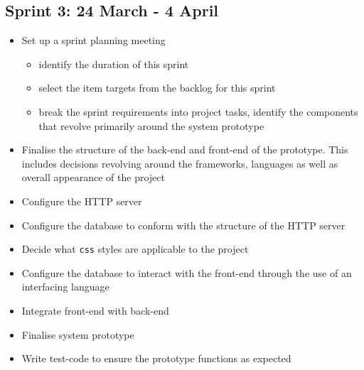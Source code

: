 \documentclass[10pt,twocolumn]{witseiepaper}
\begin{document}
	\subsection{Sprint 3: 24 March - 4 April}
	
	\begin{itemize}
		\item Set up a sprint planning meeting
		\begin{itemize}
			\item identify the duration of this sprint
			\item select the item targets from the backlog for this sprint
			\item break the sprint requirements into project tasks, identify the components that revolve primarily around the system prototype
		\end{itemize}
		\item Finalise the structure of the back-end and front-end of the prototype. This includes decisions revolving around the frameworks, languages as well as overall appearance of the project
		\item Configure the HTTP server
		\item Configure the database to conform with the structure of the HTTP server
		\item Decide what \texttt{css} styles are applicable to the project
		\item Configure the database to interact with the front-end through the use of an interfacing language
		\item Integrate front-end with back-end
		\item Finalise system prototype
		\item Write test-code to ensure the prototype functions as expected
		

\end{itemize}
\end{document}
